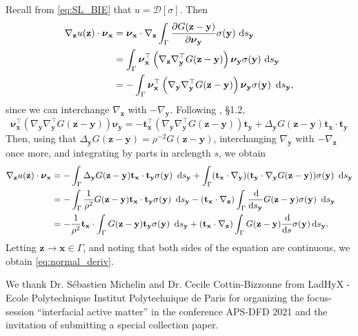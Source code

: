 \documentclass[prb,preprint,showpacs,preprintnumbers,amsmath,amssymb,longbibliography]{revtex4-1}
\newcommand{\nnu}{\boldsymbol{\nu}}
\newcommand{\xx}{\mathbf{x}}
\newcommand{\zz}{\mathbf{z}}
\newcommand{\yy}{\mathbf{y}}
\renewcommand{\tt}{\mathbf{t}}
\begin{document}
Recall from \eqref{eq:SL_BIE} that $u = \mathcal{D}[\sigma]$.
Then  
\begin{align*}
\nabla_{\zz} u(\zz) \cdot \nnu_{\xx}
&=\nnu_\xx \cdot \nabla_\zz \int_\Gamma \frac{\partial G(\zz-\yy)}{\partial \nnu_\yy}\sigma(\yy) \,\dif s_\yy\\
&=\int_\Gamma \nnu_\xx^\top \left(\nabla_\zz\nabla_\yy^\top  G(\zz-\yy)\right) \nnu_\yy\sigma(\yy)  \,\dif s_\yy\\
  &=-\int_\Gamma \nnu_\xx^\top \left(\nabla_\yy\nabla_\yy^\top G(\zz-\yy)\right)\nnu_\yy\sigma(\yy)\ \dif s_\yy,
\end{align*}
since we can interchange $\nabla_\zz$ with $-\nabla_\yy$.
Following \cite{Hsiao2008}, \S 1.2,
\[
\nnu_\xx^\top \left(\nabla_\yy\nabla_\yy^\top G(\zz-\yy)\right)\nnu_\yy
=
-\tt_{\xx}^\top \left(\nabla_\yy\nabla_\yy^\top G(\zz-\yy)\right)\tt_{\yy}
+ \Delta_{\yy}G(\zz-\yy) \tt_{\xx}\cdot \tt_{\yy}
\]
Then, using that $\Delta_{\yy} G(\zz-\yy) = \rho^{-2} G(\zz-\yy)$,
interchanging $\nabla_\yy$ with $-\nabla_\zz$ once more,
and integrating by parts in arclength $s$,
we obtain 
\begin{align*}
\nabla_{\zz} u(\zz) \cdot \nnu_{\xx}
&=-\int_\Gamma  \Delta_\yy G(\zz-\yy) {\bf t}_\xx \cdot   {\bf t}_\yy \sigma(\yy)\ \dif s_\yy
+\int_\Gamma({\bf t}_\xx\cdot\nabla_\yy)({\bf t}_\yy\cdot\nabla_\yy G(\zz-\yy))\sigma(\yy)\ \dif s_\yy\\
&= -\int_\Gamma \frac{1}{\rho^{2}} G(\zz-\yy) {\bf t}_\xx \cdot {\bf t}_\yy \sigma(\yy)\ \dif s_\yy  
-({\bf t}_\xx\cdot\nabla_\zz)\int_\Gamma \frac{\dif}{\dif s_\yy}G(\zz-\yy) \sigma(\yy)\ \dif s_\yy\\
&= -\frac{1}{\rho^2} {\bf t}_\xx\cdot \int_\Gamma G(\zz-\yy){\bf t}_\yy \sigma(\yy)\ \dif s_\yy + 
({\bf t}_\xx \cdot \nabla_\zz)\int_\Gamma G(\zz-\yy)\frac{\dif }{\dif s} \sigma(\yy)  \dif s_\yy.
\end{align*}
%
Letting $\zz\to\xx\in\Gamma$, and noting that both sides of the equation are continuous,
we obtain \eqref{eq:normal_deriv}.


\begin{acknowledgments}
We thank Dr. S\'ebastien Michelin and Dr. Cecile Cottin-Bizzonne from LadHyX - Ecole Polytechnique Institut Polytechnique de Paris for organizing the focus-session ``interfacial active matter'' in the conference APS-DFD 2021 and the invitation of submitting a special collection paper. 

\end{acknowledgments}


\end{document}
